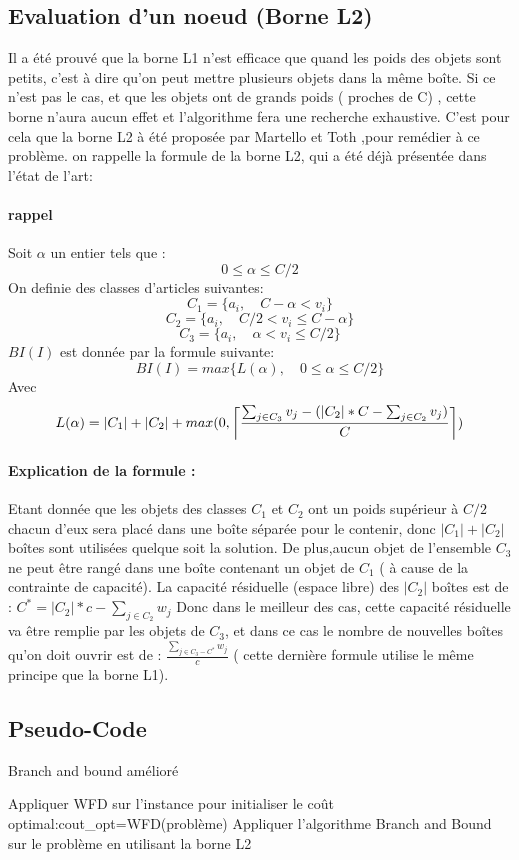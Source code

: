 \documentclass[12pt]{article}
\DeclarePairedDelimiter\ceil{\lceil}{\rceil}
\begin{document}
\subsection*{Evaluation d'un noeud (Borne L2)}
Il a été prouvé que la borne L1 n’est efficace que quand les poids des objets sont petits, c’est à dire qu’on peut mettre plusieurs objets dans la même boîte. Si ce n’est pas le cas, et que les objets ont de grands poids ( proches de C) , cette borne n’aura aucun effet et l’algorithme fera une recherche exhaustive. 
C’est pour cela que la borne L2 à été proposée par Martello et Toth ,pour remédier à ce problème. 
on rappelle la formule de la borne L2, qui a été déjà présentée dans l’état de l’art:
\paragraph{rappel}
Soit \(\alpha\) un entier tels que :
\[0 \le \alpha \le C/2\]
On definie des classes d'articles suivantes: 
\[C_1 = \{a_i, \quad C-\alpha < v_i\} \]
\[C_2 = \{a_i, \quad C/2 < v_i \le C-\alpha\} \]
\[C_3 = \{a_i, \quad \alpha < v_i \le C/2\} \]
\(BI(I)\)  est donnée par la formule suivante:
\[BI(I)=max\{L(\alpha),\quad 0 \le \alpha \le C/2\}\]
Avec
\[L(\alpha)=|C_1|+|C_2|+max(0, \ceil*{\frac{\sum_{j \in C_3}^{} v_j - (|C_2|*C - \sum_{j \in C_2}^{} v_j) }{C}})\]
\paragraph{Explication de la formule :}
Etant donnée que les objets des classes $C_1$ et $C_2$ ont un poids supérieur à $C/2$ chacun d'eux sera placé dans une boîte séparée pour le contenir, donc
$|C_1|+|C_2|$boîtes sont utilisées quelque soit la solution. De plus,aucun objet de l’ensemble $C_3$ ne peut être rangé dans une boîte contenant un objet de $C_1$ ( à cause de la contrainte de capacité). La capacité résiduelle (espace libre) des
$|C_2|$ boîtes est de : $C^*=|C_2|*c-\sum_{j \in C_2}^{} w_j$
Donc dans le meilleur des cas, cette capacité résiduelle va être remplie par les objets de $C_3$, et dans ce cas le nombre de nouvelles boîtes qu’on doit ouvrir est de :  
$\frac{\sum_{j \in C_3 -C^*}^{} w_j}{c}$ ( cette dernière formule utilise le même principe que la borne L1).
\subsection{Pseudo-Code}
\begin{algorithm}[H]
   \caption{Branch and bound amélioré }
   \begin{algorithmic} 
   \STATE Appliquer WFD sur l’instance pour initialiser le coût optimal:\linebreak cout\_opt=WFD(problème)
   \STATE Appliquer l’algorithme Branch and Bound sur le problème en utilisant la borne L2
   \end{algorithmic} 
\end{algorithm}
\end{document}
